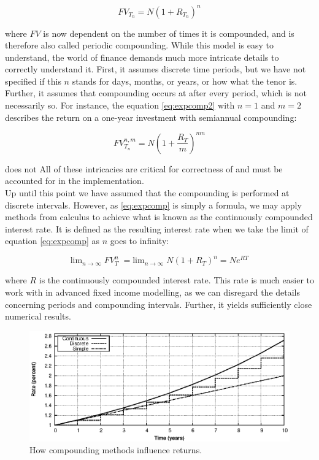 \begin{equation}\label{eq:expcomp}
FV_{T_n} = N (1 + R_{T_n})^n
\end{equation}

where $FV$ is now dependent on the number of times it is compounded, and is 
therefore also called periodic compounding.
While this model is easy to understand, the world of finance demands much more 
intricate details to correctly understand it. First, it assumes 
discrete time periods, but we have not specified if this $n$ stands for days, 
months, or years, or how what the tenor is. Further, it assumes that compounding
occurs at after every period, which is not necessarily so. For instance, the
equation \ref{eq:expcomp2} with $n=1$ and $m=2$ describes the return on a one-year
investment with semiannual compounding:

\begin{equation}\label{eq:expcomp2}
FV_{T_n}^{n,m} = N (1 + \frac{R_T}{m})^{mn}
\end{equation}

does not  All of these intricacies are critical for correctness of \hql and must
be accounted for in the implementation.\\

Up until this point we have assumed that the compounding is performed at 
discrete intervals. However, as \ref{eq:expcomp} is simply a formula, we may apply 
methods  from calculus to achieve what is known as the continuously compounded interest 
rate. It is defined as the resulting interest rate when we take the limit of 
equation \ref{eq:expcomp} as $n$ goes to infinity:

\begin{equation}
\text{lim}_{n \rightarrow \infty}\; FV_T^n \; = \text{lim}_{n \rightarrow \infty}\; N (1 + R_T)^n
= N e^{RT}
\end{equation}

where $R$ is the continuously compounded interest rate. This rate is much easier
to work with in advanced fixed income modelling\cite{cmunk}, as we can disregard
the details concerning periods and compounding intervals. Further, it yields
sufficiently close numerical results.

\begin{figure}[!htb]
\centering
\includegraphics[scale=1.2]{images/comp02.eps}
\caption{How compounding methods influence returns.}
\label{fig:comp02}
\end{figure}

